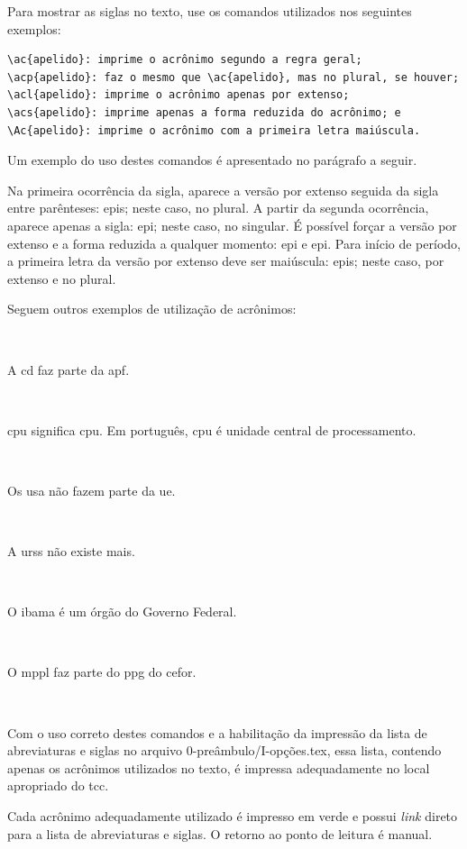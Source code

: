 Para mostrar as siglas no texto, use os comandos utilizados nos seguintes exemplos:
\begin{verbatim}
\ac{apelido}: imprime o acrônimo segundo a regra geral;
\acp{apelido}: faz o mesmo que \ac{apelido}, mas no plural, se houver;
\acl{apelido}: imprime o acrônimo apenas por extenso;
\acs{apelido}: imprime apenas a forma reduzida do acrônimo; e
\Ac{apelido}: imprime o acrônimo com a primeira letra maiúscula.  
\end{verbatim}

Um exemplo do uso destes comandos é apresentado no parágrafo a seguir.

Na primeira ocorrência da sigla, aparece a versão por extenso seguida da sigla entre parênteses: \acp{epi}; neste caso, no plural. A partir da segunda ocorrência, aparece apenas a sigla: \ac{epi}; neste caso, no singular. É possível forçar a versão por extenso e a forma reduzida a qualquer momento: \acl{epi} e \acs{epi}. Para início de período, a primeira letra da versão por extenso deve ser maiúscula: \Aclp{epi}; neste caso, por extenso e no plural.

Seguem outros exemplos de utilização de acrônimos:

\

A \ac{cd} faz parte da \ac{apf}.

\

\acs{cpu} significa \acl{cpu}. Em português, \ac{cpu} é unidade central de processamento.

\

Os \ac{usa} não fazem parte da \ac{ue}.

\

A \ac{urss} não existe mais.

\

O \ac{ibama} é um órgão do Governo Federal.

\

O \ac{mppl} faz parte do \ac{ppg} do \ac{cefor}.

\

Com o uso correto destes comandos e a habilitação da impressão da lista de abreviaturas e siglas no arquivo \textsf{0-preâmbulo/I-opções.tex}, essa lista, contendo apenas os acrônimos utilizados no texto, é impressa adequadamente no local apropriado do \ac{tcc}.

Cada acrônimo adequadamente utilizado é impresso em \textcolor{verdeCopos}{verde} e possui \textit{link} direto para a lista de abreviaturas e siglas. O retorno ao ponto de leitura é manual.

